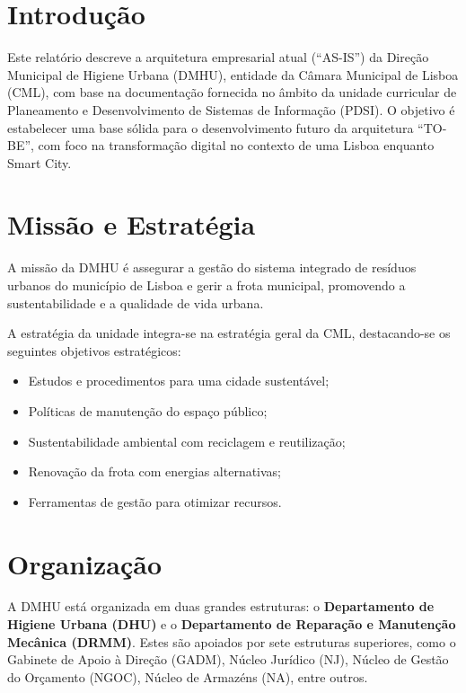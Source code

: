 \documentclass[12pt,a4paper,final]{article}
\begin{document}
    \renewcommand{\contentsname}{Índice}
    \cleardoublepage
    \tableofcontents
    \newpage
    \listoffigures
    \newpage
    \listoftables
    \newpage
    \cleardoublepage


    \section{Introdução}\label{sec:introducao}
    Este relatório descreve a arquitetura empresarial atual (“AS-IS”) da Direção Municipal de Higiene Urbana (DMHU), entidade da Câmara Municipal de Lisboa (CML), com base na documentação fornecida no âmbito da unidade curricular de Planeamento e Desenvolvimento de Sistemas de Informação (PDSI). O objetivo é estabelecer uma base sólida para o desenvolvimento futuro da arquitetura “TO-BE”, com foco na transformação digital no contexto de uma Lisboa enquanto Smart City.


    \section{Missão e Estratégia}\label{sec:missao-e-estrategia}
    A missão da DMHU é assegurar a gestão do sistema integrado de resíduos urbanos do município de Lisboa e gerir a frota municipal, promovendo a sustentabilidade e a qualidade de vida urbana.

    A estratégia da unidade integra-se na estratégia geral da CML, destacando-se os seguintes objetivos estratégicos:
    \begin{itemize}
        \item Estudos e procedimentos para uma cidade sustentável;
        \item Políticas de manutenção do espaço público;
        \item Sustentabilidade ambiental com reciclagem e reutilização;
        \item Renovação da frota com energias alternativas;
        \item Ferramentas de gestão para otimizar recursos.
    \end{itemize}


    \section{Organização}\label{sec:organizacao}
    A DMHU está organizada em duas grandes estruturas: o \textbf{Departamento de Higiene Urbana (DHU)} e o \textbf{Departamento de Reparação e Manutenção Mecânica (DRMM)}.
    Estes são apoiados por sete estruturas superiores, como o Gabinete de Apoio à Direção (GADM), Núcleo Jurídico (NJ), Núcleo de Gestão do Orçamento (NGOC), Núcleo de Armazéns (NA), entre outros.
\end{document}
